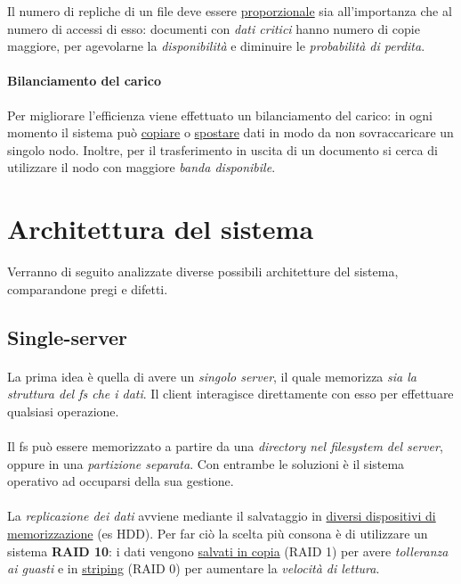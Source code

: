 \documentclass[11pt,a4paper,english]{article}
\begin{document}
Il numero di repliche di un file deve essere \underline{proporzionale} sia all'importanza che al numero di accessi di esso: documenti con \emph{dati critici} hanno numero di copie maggiore, per agevolarne la \emph{disponibilità} e diminuire le \emph{probabilità di perdita}. 


\paragraph{Bilanciamento del carico} Per migliorare l'efficienza viene effettuato un bilanciamento del carico: in ogni momento il sistema può \underline{copiare} o \underline{spostare} dati in modo da non sovraccaricare un singolo nodo. Inoltre, per il trasferimento in uscita di un documento si cerca di utilizzare il nodo con maggiore \emph{banda disponibile}. 



\section{Architettura del sistema}

Verranno di seguito analizzate diverse possibili architetture del sistema, comparandone pregi e difetti. 

\subsection{Single-server}

\paragraph{} La prima idea è quella di avere un \emph{singolo server}, il quale memorizza \emph{sia la struttura del fs che i dati}. Il client interagisce direttamente con esso per effettuare qualsiasi operazione. 

\paragraph{} Il fs può essere memorizzato a partire da una \emph{directory nel filesystem del server}, oppure in una \emph{partizione separata}. Con entrambe le soluzioni è il sistema operativo ad occuparsi della sua gestione.

\paragraph{} La \emph{replicazione dei dati} avviene mediante il salvataggio in \underline{diversi dispositivi di memorizzazione} (es HDD). Per far ciò la scelta più consona è di utilizzare un sistema \textbf{RAID 10}\cite{raid}: i dati vengono \underline{salvati in copia} (RAID 1) per avere \emph{tolleranza ai guasti} e in \underline{striping} (RAID 0) per aumentare la \emph{velocità di lettura}. 
\end{document}

